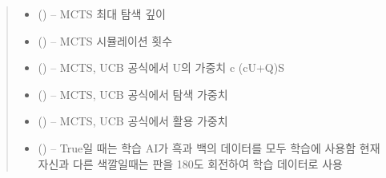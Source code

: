 \documentclass[letterpaper,10pt,english]{sphinxmanual}
\begin{document}
\begin{fulllineitems}
\begin{fulllineitems}
\begin{quote}
\begin{description}
\begin{itemize}
\item {} 
 () -- MCTS 최대 탐색 깊이

\item {} 
 () -- MCTS 시뮬레이션 횟수

\item {} 
 () -- MCTS, UCB 공식에서 U의 가중치 c (cU+Q)S

\item {} 
 () -- MCTS, UCB 공식에서 탐색 가중치

\item {} 
 () -- MCTS, UCB 공식에서 활용 가중치

\item {} 
 () -- True일 때는 학습 AI가 흑과 백의 데이터를 모두 학습에 사용함
현재 자신과 다른 색깔일때는 판을 180도 회전하여 학습 데이터로 사용

\end{itemize}

\end{description}\end{quote}

\end{fulllineitems}


\end{fulllineitems}

\end{document}
